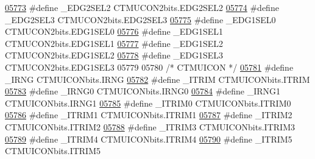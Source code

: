 \begin{DoxyCode}
\hypertarget{a00009_source_l05773}{}\hyperlink{a00009_a8f7e266b2ce913ae4cbfea2be943c2d5}{05773} \textcolor{preprocessor}{#define \_EDG2SEL2 CTMUCON2bits.EDG2SEL2}
\hypertarget{a00009_source_l05774}{}\hyperlink{a00009_a8d530ac7fdee290ca241d6a2902784a2}{05774} \textcolor{preprocessor}{#define \_EDG2SEL3 CTMUCON2bits.EDG2SEL3}
\hypertarget{a00009_source_l05775}{}\hyperlink{a00009_ad567073f637390a8ab590bd417ff442c}{05775} \textcolor{preprocessor}{#define \_EDG1SEL0 CTMUCON2bits.EDG1SEL0}
\hypertarget{a00009_source_l05776}{}\hyperlink{a00009_ab3efc64d1f960c5fe8504a0f3f81f608}{05776} \textcolor{preprocessor}{#define \_EDG1SEL1 CTMUCON2bits.EDG1SEL1}
\hypertarget{a00009_source_l05777}{}\hyperlink{a00009_a77c6d22d23173cb001291d6304ac0645}{05777} \textcolor{preprocessor}{#define \_EDG1SEL2 CTMUCON2bits.EDG1SEL2}
\hypertarget{a00009_source_l05778}{}\hyperlink{a00009_a514fe90dd2e84c565c72c3037bfcb1c3}{05778} \textcolor{preprocessor}{#define \_EDG1SEL3 CTMUCON2bits.EDG1SEL3}
05779 
05780 \textcolor{comment}{/* CTMUICON */}
\hypertarget{a00009_source_l05781}{}\hyperlink{a00009_ac106fa1060b72a6eaf5f9e377519a702}{05781} \textcolor{preprocessor}{#define \_IRNG CTMUICONbits.IRNG}
\hypertarget{a00009_source_l05782}{}\hyperlink{a00009_a49004872342164376c6113a04ffc548e}{05782} \textcolor{preprocessor}{#define \_ITRIM CTMUICONbits.ITRIM}
\hypertarget{a00009_source_l05783}{}\hyperlink{a00009_a39cdd2c445cdf6ffde3d061c4cb1166d}{05783} \textcolor{preprocessor}{#define \_IRNG0 CTMUICONbits.IRNG0}
\hypertarget{a00009_source_l05784}{}\hyperlink{a00009_a72af5ef6b5aa5fd79389a1f0190bcff3}{05784} \textcolor{preprocessor}{#define \_IRNG1 CTMUICONbits.IRNG1}
\hypertarget{a00009_source_l05785}{}\hyperlink{a00009_ac86a6f277d895c520ece1423079bdcf7}{05785} \textcolor{preprocessor}{#define \_ITRIM0 CTMUICONbits.ITRIM0}
\hypertarget{a00009_source_l05786}{}\hyperlink{a00009_a43dde7ec808fb8703111a29725a0db3d}{05786} \textcolor{preprocessor}{#define \_ITRIM1 CTMUICONbits.ITRIM1}
\hypertarget{a00009_source_l05787}{}\hyperlink{a00009_ae6d71dd7b8bd5ac68a06536127435b5b}{05787} \textcolor{preprocessor}{#define \_ITRIM2 CTMUICONbits.ITRIM2}
\hypertarget{a00009_source_l05788}{}\hyperlink{a00009_add368b03e9d29e56b423a99057d8a8d4}{05788} \textcolor{preprocessor}{#define \_ITRIM3 CTMUICONbits.ITRIM3}
\hypertarget{a00009_source_l05789}{}\hyperlink{a00009_a8f433458adb0b2738292ef045f55f9cd}{05789} \textcolor{preprocessor}{#define \_ITRIM4 CTMUICONbits.ITRIM4}
\hypertarget{a00009_source_l05790}{}\hyperlink{a00009_adea38fa927f3d5b6b91c1cbeb8c78c9b}{05790} \textcolor{preprocessor}{#define \_ITRIM5 CTMUICONbits.ITRIM5}

\end{DoxyCode}
